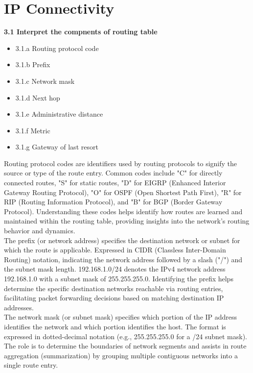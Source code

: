 \documentclass{article}
\begin{document}
\section{IP Connectivity}
\textbf{3.1 Interpret the compnents of routing table}
\begin{itemize}
\item 3.1.a Routing protocol code
\item 3.1.b Prefix
\item 3.1.c Network mask
\item 3.1.d Next hop
\item 3.1.e Administrative distance
\item 3.1.f Metric
\item 3.1.g Gateway of last resort
\end{itemize}

	Routing protocol codes are identifiers used by routing protocols to signify the source or type of the route entry. Common codes include "C" for directly connected routes, "S" for static routes, "D" for EIGRP (Enhanced Interior Gateway Routing Protocol), "O" for OSPF (Open Shortest Path First), "R" for RIP (Routing Information Protocol), and "B" for BGP (Border Gateway Protocol). Understanding these codes helps identify how routes are learned and maintained within the routing table, providing insights into the network's routing behavior and dynamics.\\
	
	The prefix (or network address) specifies the destination network or subnet for which the route is applicable. Expressed in CIDR (Classless Inter-Domain Routing) notation, indicating the network address followed by a slash ("/") and the subnet mask length. 192.168.1.0/24 denotes the IPv4 network address 192.168.1.0 with a subnet mask of 255.255.255.0. Identifying the prefix helps determine the specific destination networks reachable via routing entries, facilitating packet forwarding decisions based on matching destination IP addresses.\\
	
	The network mask (or subnet mask) specifies which portion of the IP address identifies the network and which portion identifies the host. The format is expressed in dotted-decimal notation (e.g., 255.255.255.0 for a /24 subnet mask). The role is to determine the boundaries of network segments and assists in route aggregation (summarization) by grouping multiple contiguous networks into a single route entry.\\
	
\end{document}
